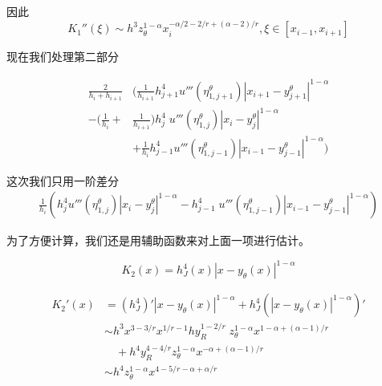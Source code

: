 \documentclass{ctexart}
\theoremstyle{definition}
\theoremstyle{remark}
\numberwithin{equation}{section}
\begin{document}
因此
\begin{equation}
    K_1''(\xi) \sim h^3 z_\theta^{1-\alpha} x_i^{-\alpha/2-2/r+(\alpha-2)/r} , \xi \in [x_{i-1}, x_{i+1}]
\end{equation}

现在我们处理第二部分

\begin{equation}
    \begin{aligned}
        \frac{2}{h_i + h_{i+1}}
                             & ( \frac{1}{h_{i+1}}  h_{j+1}^{4} u'''(\eta_{1,j+1}^\theta) |x_{i+1} - y_{j+1}^\theta|^{1-\alpha} \\
        - (\frac{1}{h_{i}} + & \frac{1}{h_{i+1}}) h_j^{4} \; u'''(\eta_{1,j}^\theta) |x_i - y_j^\theta|^{1-\alpha}              \\
                             & +  \frac{1}{h_{i}} h_{j-1}^{4} u'''(\eta_{1,j-1}^\theta) |x_{i-1} - y_{j-1}^\theta|^{1-\alpha} )
    \end{aligned}
\end{equation}

这次我们只用一阶差分
\begin{equation}
    \begin{aligned}
        \frac{1}{h_{i}} ( h_{j}^{4} u'''(\eta_{1,j}^\theta) |x_{i} - y_{j}^\theta|^{1-\alpha}
        - h_{j-1}^{4} \; u'''(\eta_{1,j-1}^\theta) |x_{i-1} - y_{j-1}^\theta|^{1-\alpha} )
    \end{aligned}
\end{equation}

为了方便计算，我们还是用辅助函数来对上面一项进行估计。

\begin{equation}
    K_2(x) = h_J^4(x)|x-y_\theta(x)|^{1-\alpha}
\end{equation}

\begin{equation}
    \begin{aligned}
        K_2'(x) & = (h_J^4)'|x-y_\theta(x)|^{1-\alpha} + h_J^4 (|x-y_\theta(x)|^{1-\alpha})'                  \\
                & \sim h^3 x^{3-3/r} x^{1/r-1} h y_R^{1-2/r} \; z_\theta^{1-\alpha} x^{1-\alpha+(\alpha-1)/r} \\
                & \quad + h^4 y_R^{4-4/r} z_\theta^{1-\alpha} x^{-\alpha + (\alpha-1)/r}                      \\
                & \sim h^4 z_\theta^{1-\alpha} x^{4-5/r-\alpha+\alpha/r}
    \end{aligned}
\end{equation}
\end{document}
